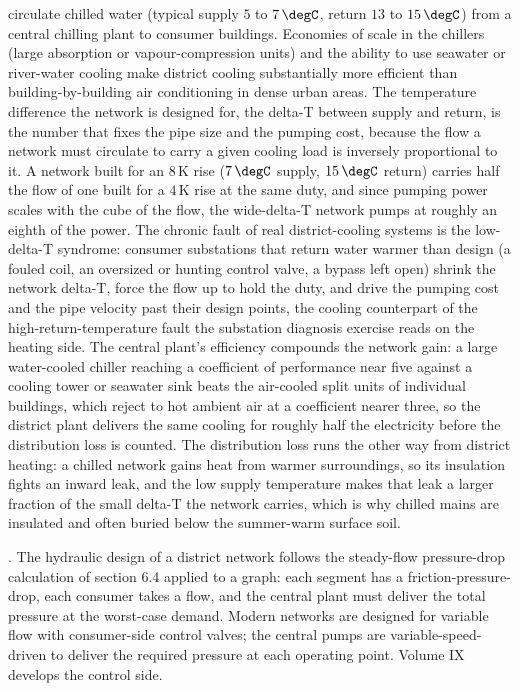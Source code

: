  circulate chilled water (typical
supply $5$ to $7\,\degC$, return $13$ to $15\,\degC$) from a central
chilling plant to consumer buildings. Economies of scale in the
chillers (large absorption or vapour-compression units) and the
ability to use seawater or river-water cooling make district cooling
substantially more efficient than building-by-building air
conditioning in dense urban areas. The temperature difference the
network is designed for, the delta-T between supply and return, is the
number that fixes the pipe size and the pumping cost, because the flow a
network must circulate to carry a given cooling load is inversely
proportional to it. A network built for an $8\,\si{\kelvin}$ rise
($7\,\degC$ supply, $15\,\degC$ return) carries half the flow of one
built for a $4\,\si{\kelvin}$ rise at the same duty, and since pumping
power scales with the cube of the flow, the wide-delta-T network pumps
at roughly an eighth of the power. The chronic fault of real
district-cooling systems is the low-delta-T syndrome: consumer
substations that return water warmer than design (a fouled coil, an
oversized or hunting control valve, a bypass left open) shrink the
network delta-T, force the flow up to hold the duty, and drive the
pumping cost and the pipe velocity past their design points, the
cooling counterpart of the high-return-temperature fault the substation
diagnosis exercise reads on the heating side. The central plant's
efficiency compounds the network gain: a large water-cooled chiller
reaching a coefficient of performance near five against a cooling tower
or seawater sink beats the air-cooled split units of individual
buildings, which reject to hot ambient air at a coefficient nearer
three, so the district plant delivers the same cooling for roughly half
the electricity before the distribution loss is counted. The
distribution loss runs the other way from district heating: a chilled
network gains heat from warmer surroundings, so its insulation fights
an inward leak, and the low supply temperature makes that leak a larger
fraction of the small delta-T the network carries, which is why chilled
mains are insulated and often buried below the summer-warm surface soil.

. The hydraulic design of a district network
follows the steady-flow pressure-drop calculation of section 6.4
applied to a graph: each segment has a friction-pressure-drop, each
consumer takes a flow, and the central plant must deliver the total
pressure at the worst-case demand. Modern networks are designed for
variable flow with consumer-side control valves; the central pumps
are variable-speed-driven to deliver the required pressure at each
operating point. Volume IX develops the control side.

